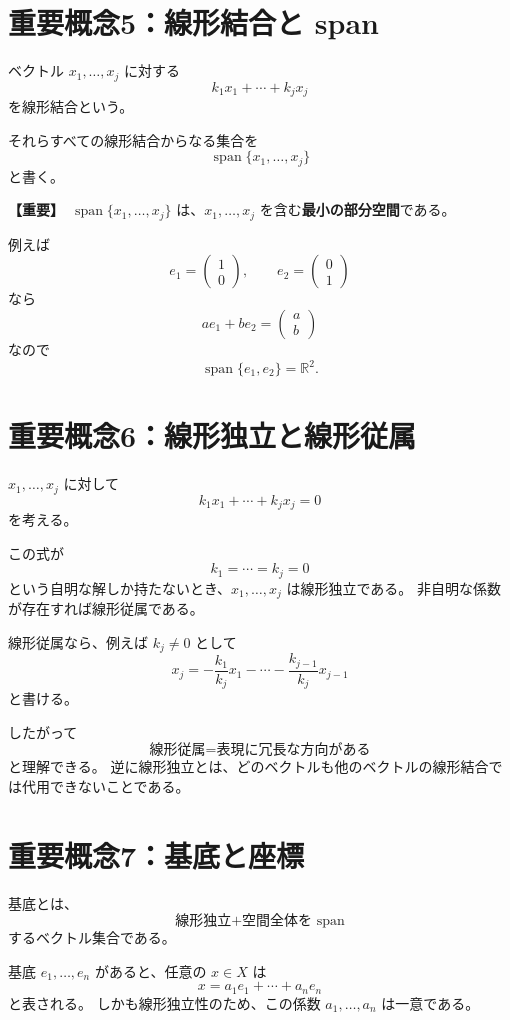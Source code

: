\documentclass[a4paper,11pt]{ltjsarticle}
\newcommand{\R}{\mathbb{R}}
\newcommand{\Span}{\operatorname{span}}
\newcommand{\highimportance}{\textbf{【重要】}}
\begin{document}
\section{重要概念5：線形結合と span}

ベクトル $x_1,\dots,x_j$ に対する
\[
k_1x_1+\cdots+k_jx_j
\]
を線形結合という。

それらすべての線形結合からなる集合を
\[
\Span\{x_1,\dots,x_j\}
\]
と書く。

\highimportance\ $\Span\{x_1,\dots,x_j\}$ は、$x_1,\dots,x_j$ を含む\textbf{最小の部分空間}である。

例えば
\[
e_1=\begin{pmatrix}1\\0\end{pmatrix},\qquad
 e_2=\begin{pmatrix}0\\1\end{pmatrix}
\]
なら
\[
ae_1+be_2=\begin{pmatrix}a\\b\end{pmatrix}
\]
なので
\[
\Span\{e_1,e_2\}=\R^2.
\]

\section{重要概念6：線形独立と線形従属}

$x_1,\dots,x_j$ に対して
\[
k_1x_1+\cdots+k_jx_j=0
\]
を考える。

この式が
\[
k_1=\cdots=k_j=0
\]
という自明な解しか持たないとき、$x_1,\dots,x_j$ は線形独立である。
非自明な係数が存在すれば線形従属である。

線形従属なら、例えば $k_j\neq 0$ として
\[
x_j
=-\frac{k_1}{k_j}x_1-\cdots-\frac{k_{j-1}}{k_j}x_{j-1}
\]
と書ける。

したがって
\[
\boxed{\text{線形従属}=\text{表現に冗長な方向がある}}
\]
と理解できる。
逆に線形独立とは、どのベクトルも他のベクトルの線形結合では代用できないことである。

\section{重要概念7：基底と座標}

基底とは、
\[
\boxed{\text{線形独立} + \text{空間全体を span}}
\]
するベクトル集合である。

基底 $e_1,\dots,e_n$ があると、任意の $x\in X$ は
\[
x=a_1e_1+\cdots+a_ne_n
\]
と表される。
しかも線形独立性のため、この係数 $a_1,\dots,a_n$ は一意である。
\end{document}
